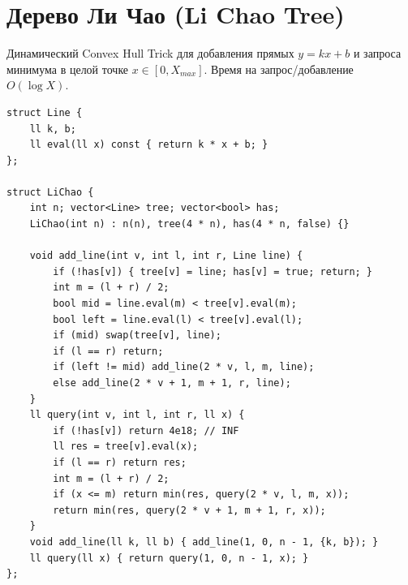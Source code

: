 \section{Дерево Ли Чао (Li Chao Tree)}
Динамический Convex Hull Trick для добавления прямых $y = kx + b$ и запроса минимума в целой точке $x \in [0, X_{max}]$. Время на запрос/добавление $O(\log X)$.
\begin{lstlisting}[name=li_chao]
struct Line {
    ll k, b;
    ll eval(ll x) const { return k * x + b; }
};

struct LiChao {
    int n; vector<Line> tree; vector<bool> has;
    LiChao(int n) : n(n), tree(4 * n), has(4 * n, false) {}

    void add_line(int v, int l, int r, Line line) {
        if (!has[v]) { tree[v] = line; has[v] = true; return; }
        int m = (l + r) / 2;
        bool mid = line.eval(m) < tree[v].eval(m);
        bool left = line.eval(l) < tree[v].eval(l);
        if (mid) swap(tree[v], line);
        if (l == r) return;
        if (left != mid) add_line(2 * v, l, m, line);
        else add_line(2 * v + 1, m + 1, r, line);
    }
    ll query(int v, int l, int r, ll x) {
        if (!has[v]) return 4e18; // INF
        ll res = tree[v].eval(x);
        if (l == r) return res;
        int m = (l + r) / 2;
        if (x <= m) return min(res, query(2 * v, l, m, x));
        return min(res, query(2 * v + 1, m + 1, r, x));
    }
    void add_line(ll k, ll b) { add_line(1, 0, n - 1, {k, b}); }
    ll query(ll x) { return query(1, 0, n - 1, x); }
};
\end{lstlisting}

